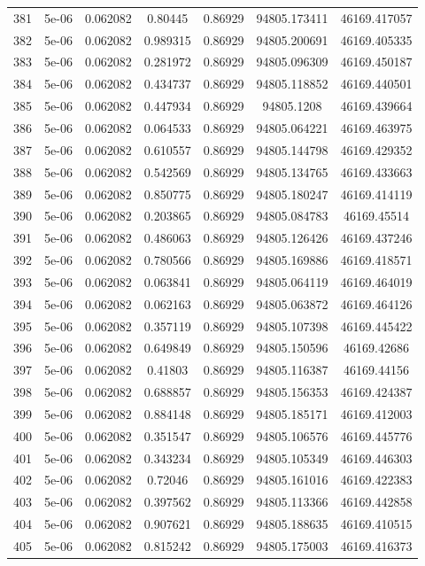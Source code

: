 \begin{table}
\begin{tabular*}{\linewidth}{c|c|c|c|c|c|c}
381 & 5e-06 & 0.062082 & 0.80445 & 0.86929 & 94805.173411 & 46169.417057\\
382 & 5e-06 & 0.062082 & 0.989315 & 0.86929 & 94805.200691 & 46169.405335\\
383 & 5e-06 & 0.062082 & 0.281972 & 0.86929 & 94805.096309 & 46169.450187\\
384 & 5e-06 & 0.062082 & 0.434737 & 0.86929 & 94805.118852 & 46169.440501\\
385 & 5e-06 & 0.062082 & 0.447934 & 0.86929 & 94805.1208 & 46169.439664\\
386 & 5e-06 & 0.062082 & 0.064533 & 0.86929 & 94805.064221 & 46169.463975\\
387 & 5e-06 & 0.062082 & 0.610557 & 0.86929 & 94805.144798 & 46169.429352\\
388 & 5e-06 & 0.062082 & 0.542569 & 0.86929 & 94805.134765 & 46169.433663\\
389 & 5e-06 & 0.062082 & 0.850775 & 0.86929 & 94805.180247 & 46169.414119\\
390 & 5e-06 & 0.062082 & 0.203865 & 0.86929 & 94805.084783 & 46169.45514\\
391 & 5e-06 & 0.062082 & 0.486063 & 0.86929 & 94805.126426 & 46169.437246\\
392 & 5e-06 & 0.062082 & 0.780566 & 0.86929 & 94805.169886 & 46169.418571\\
393 & 5e-06 & 0.062082 & 0.063841 & 0.86929 & 94805.064119 & 46169.464019\\
394 & 5e-06 & 0.062082 & 0.062163 & 0.86929 & 94805.063872 & 46169.464126\\
395 & 5e-06 & 0.062082 & 0.357119 & 0.86929 & 94805.107398 & 46169.445422\\
396 & 5e-06 & 0.062082 & 0.649849 & 0.86929 & 94805.150596 & 46169.42686\\
397 & 5e-06 & 0.062082 & 0.41803 & 0.86929 & 94805.116387 & 46169.44156\\
398 & 5e-06 & 0.062082 & 0.688857 & 0.86929 & 94805.156353 & 46169.424387\\
399 & 5e-06 & 0.062082 & 0.884148 & 0.86929 & 94805.185171 & 46169.412003\\
400 & 5e-06 & 0.062082 & 0.351547 & 0.86929 & 94805.106576 & 46169.445776\\
401 & 5e-06 & 0.062082 & 0.343234 & 0.86929 & 94805.105349 & 46169.446303\\
402 & 5e-06 & 0.062082 & 0.72046 & 0.86929 & 94805.161016 & 46169.422383\\
403 & 5e-06 & 0.062082 & 0.397562 & 0.86929 & 94805.113366 & 46169.442858\\
404 & 5e-06 & 0.062082 & 0.907621 & 0.86929 & 94805.188635 & 46169.410515\\
405 & 5e-06 & 0.062082 & 0.815242 & 0.86929 & 94805.175003 & 46169.416373\\
\end{tabular*}
\end{table}
